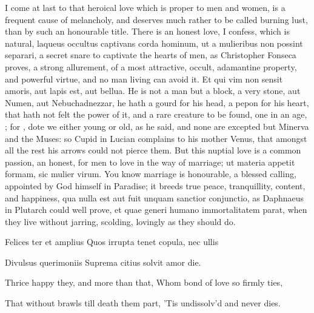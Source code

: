 {I come at last to that heroical love which is proper to men and women,
is a frequent cause of melancholy, and deserves much rather to be
called burning lust, than by such an honourable title. There is an
honest love, I confess, which is natural, laqueus occultus captivans
corda hominum, ut a mulieribus non possint separari, a secret snare to
captivate the hearts of men, as Christopher Fonseca proves, a
strong allurement, of a most attractive, occult, adamantine property,
and powerful virtue, and no man living can avoid it. Et qui vim
non sensit amoris, aut lapis est, aut bellua. He is not a man but a
block, a very stone, aut Numen, aut Nebuchadnezzar, he hath a
gourd for his head, a pepon for his heart, that hath not felt the power
of it, and a rare creature to be found, one in an age, ; for , dote
we either young or old, as he said, and none are excepted but
Minerva and the Muses: so Cupid in Lucian complains to his mother
Venus, that amongst all the rest his arrows could not pierce them. But
this nuptial love is a common passion, an honest, for men to love in
the way of marriage; ut materia appetit formam, sic mulier virum.
You know marriage is honourable, a blessed calling, appointed by
God himself in Paradise; it breeds true peace, tranquillity, content,
and happiness, qua nulla est aut fuit unquam sanctior conjunctio, as
Daphnaeus in Plutarch could well prove, et quae generi humano
immortalitatem parat, when they live without jarring, scolding,
lovingly as they should do.

Felices ter et amplius
Quos irrupta tenet copula, nec ullis

Divulsus querimoniis
Suprema citius solvit amor die.


Thrice happy they, and more than that,
Whom bond of love so firmly ties,

That without brawls till death them part,
'Tis undissolv'd and never dies.

}
